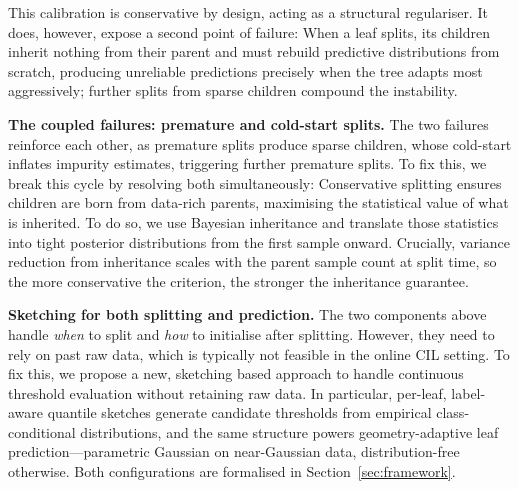 \documentclass{article}
\begin{document}
This calibration is conservative
by design, acting as a structural regulariser. It does, however, expose
a second point of failure: When a leaf splits, its children inherit nothing from
their parent and must rebuild predictive distributions from scratch,
producing unreliable predictions precisely when the tree adapts most
aggressively; further splits from sparse children compound the
instability.

\noindent
\textbf{The coupled failures: premature and cold-start splits.}
The two failures reinforce each other, as premature splits produce sparse
children, whose cold-start inflates impurity estimates, triggering
further premature splits. To fix this, we break this cycle by resolving both
simultaneously: Conservative splitting ensures children are born from
data-rich parents, maximising the statistical value of what is inherited.
To do so, we use Bayesian inheritance and translate those statistics into tight posterior
distributions from the first sample onward. Crucially, variance reduction
from inheritance scales with the parent sample count at split time, so
the more conservative the criterion, the stronger the inheritance
guarantee.

\noindent
\textbf{Sketching for both splitting and prediction.}
The two components above handle \emph{when} to split and \emph{how} to
initialise after splitting. 
However, they need to rely on past raw data, which is typically not feasible in the online CIL setting.
To fix this, we propose a new, sketching based approach to handle continuous threshold evaluation
without retaining raw data. In particular, per-leaf, label-aware quantile sketches generate
candidate thresholds from empirical class-conditional distributions, and the
same structure powers geometry-adaptive leaf prediction---parametric Gaussian
on near-Gaussian data, distribution-free otherwise. Both configurations are
formalised in Section~\ref{sec:framework}.
\end{document}
